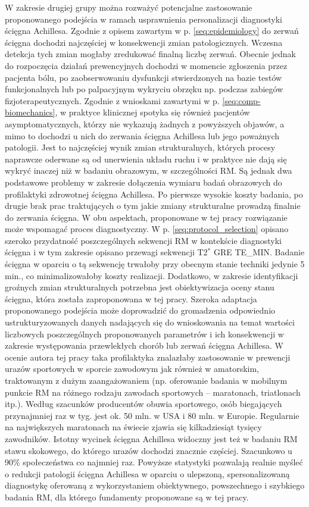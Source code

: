 W zakresie drugiej grupy można rozważyć potencjalne zastosowanie proponowanego podejścia w ramach usprawnienia personalizacji diagnostyki ścięgna Achillesa. Zgodnie z opisem zawartym w p. \ref{seq:epidemiology} do zerwań ścięgna dochodzi najczęściej w konsekwencji zmian patologicznych. Wczesna detekcja tych zmian mogłaby zredukować finalną liczbę zerwań. Obecnie jednak do rozpoczęcia działań prewencyjnych dochodzi w momencie zgłoszenia przez pacjenta bólu, po zaobserwowaniu dysfunkcji stwierdzonych na bazie testów funkcjonalnych lub po palpacyjnym wykryciu obrzęku np. podczas zabiegów fizjoterapeutycznych. Zgodnie z wnioskami zawartymi w p. \ref{seq:comp-biomechanics}, w praktyce klinicznej spotyka się również pacjentów asymptomatycznych, którzy nie wykazują żadnych z powyższych objawów, a mimo to dochodzi u nich do zerwania ścięgna Achillesa lub jego poważnych patologii. Jest to najczęściej wynik zmian strukturalnych, których procesy naprawcze oderwane są od unerwienia układu ruchu i w praktyce nie dają się wykryć inaczej niż w badaniu obrazowym, w szczególności RM. Są jednak dwa podstawowe problemy w zakresie dołączenia wymiaru badań obrazowych do profilaktyki zdrowotnej ścięgna Achillesa. Po pierwsze wysokie koszty badania, po drugie brak prac traktujących o tym jakie zmiany strukturalne prowadzą finalnie do zerwania ścięgna. W obu aspektach, proponowane w tej pracy rozwiązanie może wspomagać proces diagnostyczny. W p. \ref{seq:protocol_selection} opisano szeroko przydatność poszczególnych sekwencji RM w kontekście diagnostyki ścięgna i w tym zakresie opisano przewagi sekwencji T2$^\ast$ GRE TE\_MIN. Badanie ścięgna w oparciu o tą sekwencję trwałoby przy obecnym stanie techniki jedynie 5 min., co minimalizowałoby koszty realizacji. Dodatkowo, w zakresie identyfikacji groźnych zmian strukturalnych potrzebna jest obiektywizacja oceny stanu ścięgna, która została zaproponowana w tej pracy. Szeroka adaptacja proponowanego podejścia może doprowadzić do gromadzenia odpowiednio ustrukturyzowanych danych nadających się do wnioskowania na temat wartości liczbowych poszczególnych proponowanych parametrów i ich konsekwencji w zakresie występowania przewlekłych chorób lub zerwań ścięgna Achillesa. W ocenie autora tej pracy taka profilaktyka znalazłaby zastosowanie w prewencji urazów sportowych w sporcie zawodowym jak również w amatorskim, traktowanym z dużym zaangażowaniem (np. oferowanie badania w mobilnym punkcie RM na różnego rodzaju zawodach sportowych -- maratonach, triatlonach itp.). Według szacunków producentów obuwia sportowego, osób biegających przynajmniej raz w tyg. jest ok. 50 mln. w USA i 80 mln. w Europie. Regularnie na największych maratonach na świecie zjawia się kilkadziesiąt tysięcy zawodników. Istotny wycinek ścięgna Achillesa widoczny jest też w badaniu RM stawu skokowego, do którego urazów dochodzi znacznie częściej. Szacunkowo u 90\% społeczeństwa co najmniej raz. Powyższe statystyki pozwalają realnie myśleć o redukcji patologii ścięgna Achillesa w oparciu o ulepszoną, spersonalizowaną diagnostykę oferowaną z wykorzystaniem obiektywnego, powszechnego i szybkiego badania RM, dla którego fundamenty proponowane są w tej pracy. 

